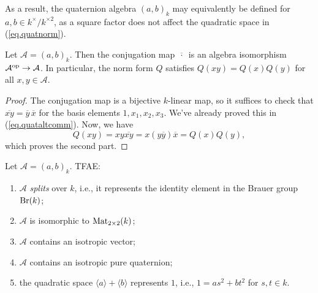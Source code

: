 \documentclass{article}
\newcommand{\qa}[2]{\left(#1\right)_{#2}}
\begin{document}
As a result, the quaternion algebra $\qa{a,b}{k}$ may equivalently be defined for $a,b\in k^\times/k^{\times 2}$, as a square factor does not affect the quadratic space in (\ref{eq.quatnorm}).

\begin{lemma}
    Let $\mathcal{A}=\qa{a,b}{k}$. Then the conjugation map $\overline{\,\cdot\,}$ is an algebra isomorphism $\mathcal{A}^{\mathrm{op}}\to\mathcal{A}$. In particular, the norm form $Q$ satisfies $Q(xy)=Q(x)Q(y)$ for all $x,y\in\mathcal{A}$.
\end{lemma}

\begin{proof}
    The conjugation map is a bijective $k$-linear map, so it suffices to check that $\overline{xy}=\overline{y}\,\overline{x}$ for the basis elements $1,x_1,x_2,x_3$. We've already proved this in (\ref{eq.quataltcomm}). Now, we have
    \begin{equation*}
        Q(xy)=xy\overline{xy}=x(y\overline{y})\overline{x}=Q(x)Q(y),
    \end{equation*}
    which proves the second part.
\end{proof}

\begin{proposition}\label{prop.splitcriterion}
    Let $\mathcal{A}=\qa{a,b}{k}$. TFAE:
    \begin{enumerate}
        \item $\mathcal{A}$ \emph{splits} over $k$, i.e., it represents the identity element in the Brauer group $\operatorname{Br}(k)$;
        \item $\mathcal{A}$ is isomorphic to $\operatorname{Mat}_{2\times 2}(k)$;
        \item $\mathcal{A}$ contains an isotropic vector;
        \item $\mathcal{A}$ contains an isotropic pure quaternion;
        \item the quadratic space $\langle a\rangle+\langle b\rangle$ represents $1$, i.e., $1=as^2+bt^2$ for $s,t\in k$.
    \end{enumerate}
\end{proposition}
\end{document}
